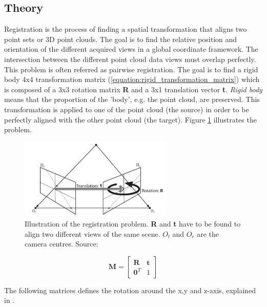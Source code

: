 \subsection{Theory}

Registration is the process of finding a spatial transformation that aligns two point sets or 3D point clouds. The goal is to find the relative position and orientation of the different acquired views in a global coordinate framework. The intersection between the different point cloud data views must overlap perfectly. This problem is often referred as pairwise registration.
The goal is to find a rigid body 4x4 transformation matrix (\ref{equation:rigid_transformation_matrix}) which is composed of a 3x3 rotation matrix \textbf{R} and a 3x1 translation vector \textbf{t}. \textit{Rigid body} means that the proportion of the 'body', e.g. the point cloud, are preserved. This transformation is applied to one of the point cloud (the source) in order to be perfectly aligned with the other point cloud (the target). Figure \ref{figure:transformation_matrix} illustrates the problem.

\begin{figure}[H]
    \centering
    \includegraphics[width=0.65\textwidth]{images/registration/essential_matrix.jpg}
    \caption{Illustration of the registration problem. \textbf{R} and \textbf{t} have to be found to align two different views of the same scene. $O_l$ and $O_r$ are the camera centres. Source: \cite{noauthor_epipolar_nodate}}
    \label{figure:transformation_matrix}
\end{figure}

\begin{equation}
\label{equation:rigid_transformation_matrix}
\mathbf{M}=\left[\begin{array}{ll}
{\mathbf{R}} & {\mathbf{t}} \\
{\mathbf{0}^T} & {1}
\end{array}\right]
\end{equation}


The following matrices defines the rotation around the x,y and z-axis, explained in \cite{noauthor_rotation_2020}.

